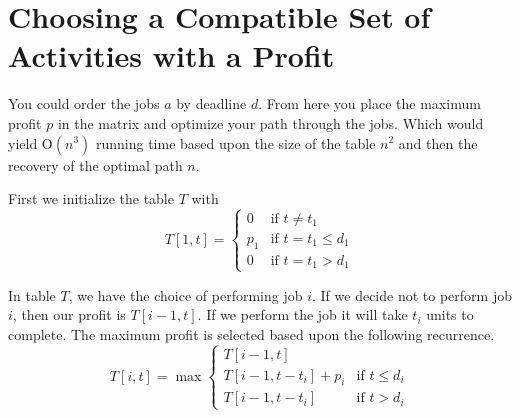 \documentclass[12pt,twoside,letterpaper]{article}
\begin{document}
\section*{Choosing a Compatible Set of Activities with a Profit}
You could order the jobs $a$ by deadline $d$. From here you place the maximum profit $p$ in the matrix and optimize your path through the jobs. Which would yield $\textrm{O}(n^3)$ running time based upon the size of the table $n^2$ and then the recovery of the optimal path $n$.

First we initialize the table $T$ with
\[ T[1,t] = \left\{ \begin{array}{ll}
0 & \mbox{if $t \ne t_1$}\\
p_1 & \mbox{if $t = t_1 \le d_1$}\\
0 & \mbox{if $t = t_1 > d_1$}\end{array} \right. \]

In table $T$, we have the choice of performing job $i$. If we decide not to perform job $i$, then our profit is $T[i-1,t]$. If we perform the job it will take $t_i$ units to complete. The maximum profit is selected based upon the following recurrence.
\[ T[i,t] = \max \left\{ \begin{array}{ll}
T[i-1,t]\\
T[i-1,t-t_i]+p_i & \mbox{if $t \le d_i$}\\
T[i-1,t-t_i] & \mbox{if $t > d_i$}\end{array} \right. \]
\end{document}
